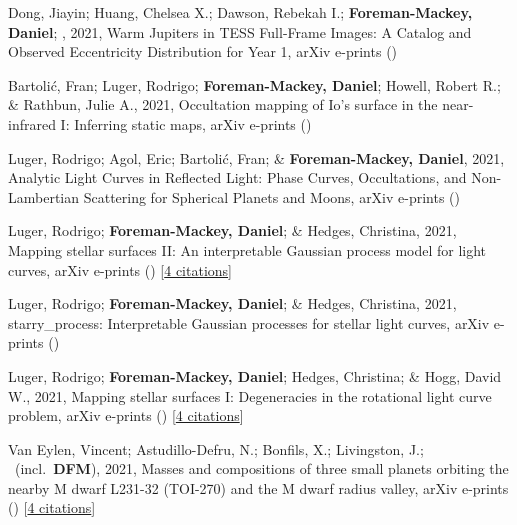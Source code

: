 \item[{\color{numcolor}\scriptsize14}] Dong, Jiayin; Huang, Chelsea X.; Dawson, Rebekah I.; \textbf{Foreman-Mackey, Daniel}; \etal, 2021, Warm Jupiters in TESS Full-Frame Images: A Catalog and Observed Eccentricity Distribution for Year 1, arXiv e-prints ()

\item[{\color{numcolor}\scriptsize13}] Bartoli{\'c}, Fran; Luger, Rodrigo; \textbf{Foreman-Mackey, Daniel}; Howell, Robert R.; \& Rathbun, Julie A., 2021, Occultation mapping of Io's surface in the near-infrared I: Inferring static maps, arXiv e-prints ()

\item[{\color{numcolor}\scriptsize12}] Luger, Rodrigo; Agol, Eric; Bartoli{\'c}, Fran; \& \textbf{Foreman-Mackey, Daniel}, 2021, Analytic Light Curves in Reflected Light: Phase Curves, Occultations, and Non-Lambertian Scattering for Spherical Planets and Moons, arXiv e-prints ()

\item[{\color{numcolor}\scriptsize11}] Luger, Rodrigo; \textbf{Foreman-Mackey, Daniel}; \& Hedges, Christina, 2021, Mapping stellar surfaces II: An interpretable Gaussian process model for light curves, arXiv e-prints () [\href{https://ui.adsabs.harvard.edu/abs/2021arXiv210201697L}{4 citations}]

\item[{\color{numcolor}\scriptsize10}] Luger, Rodrigo; \textbf{Foreman-Mackey, Daniel}; \& Hedges, Christina, 2021, starry{\_}process: Interpretable Gaussian processes for stellar light curves, arXiv e-prints ()

\item[{\color{numcolor}\scriptsize9}] Luger, Rodrigo; \textbf{Foreman-Mackey, Daniel}; Hedges, Christina; \& Hogg, David W., 2021, Mapping stellar surfaces I: Degeneracies in the rotational light curve problem, arXiv e-prints () [\href{https://ui.adsabs.harvard.edu/abs/2021arXiv210200007L}{4 citations}]

\item[{\color{numcolor}\scriptsize8}] Van Eylen, Vincent; Astudillo-Defru, N.; Bonfils, X.; Livingston, J.; \etal\ (incl.\ \textbf{DFM}), 2021, Masses and compositions of three small planets orbiting the nearby M dwarf L231-32 (TOI-270) and the M dwarf radius valley, arXiv e-prints () [\href{https://ui.adsabs.harvard.edu/abs/2021arXiv210101593V}{4 citations}]

